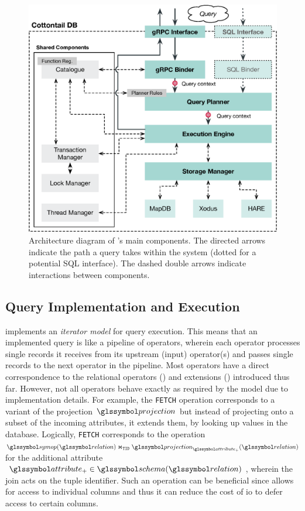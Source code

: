 \begin{figure}[bt]
    \centering
    \includegraphics[width=\textwidth]{figures/architecture.eps}
    \caption{Architecture diagram of \cottontail{}'s main components. The directed arrows indicate the path a query takes within the system (dotted for a potential SQL interface). The dashed double arrows indicate interactions between components.}
    \label{figure:cottontail_architecture}
\end{figure}


\subsection{Query Implementation and Execution}

\cottontail{} implements an \emph{iterator model} for query execution. This means that an implemented query is like a pipeline of operators, wherein each operator processes single records it receives from its upstream (input) operator(s) and passes single records to the next operator in the pipeline. Most operators have a direct correspondence to the relational operators () and extensions () introduced thus far. However, not all operators behave exactly as required by the model due to implementation details. For example, the \texttt{FETCH} operation corresponds to a variant of the projection $\projection$ but instead of projecting onto a subset of the incoming attributes, it extends them, by looking up values in the database. Logically, \texttt{FETCH} corresponds to the operation $\symop(\relation) \Join_{\mathtt{TID}} \projection_{\attribute_{+}}(\relation)$ for the additional attribute $\attribute_{+} \in \schema(\relation)$, wherein the join acts on the tuple identifier. Such an operation can be beneficial since \cottontail{} allows for access to individual columns and thus it can reduce the cost of \acrshort{io} to defer access to certain columns.

